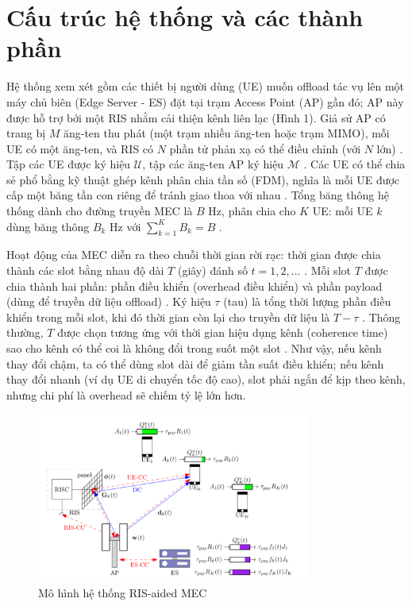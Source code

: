 \section{Cấu trúc hệ thống và các thành phần}


Hệ thống xem xét gồm các thiết bị người dùng (UE) muốn offload tác vụ lên một máy chủ biên (Edge Server - ES) đặt tại trạm Access Point (AP) gần đó; AP này được hỗ trợ bởi một RIS nhằm cải thiện kênh liên lạc (Hình 1). Giả sử AP có trang bị $M$ ăng-ten thu phát (một trạm nhiều ăng-ten hoặc trạm MIMO), mỗi UE có một ăng-ten, và RIS có $N$ phần tử phản xạ có thể điều chỉnh (với $N$ lớn) \cite{ris_latency}
. Tập các UE được ký hiệu $ \mathcal{U}$, tập các ăng-ten AP ký hiệu $ \mathcal{M}$
. Các UE có thể chia sẻ phổ bằng kỹ thuật ghép kênh phân chia tần số (FDM), nghĩa là mỗi UE được cấp một băng tần con riêng để tránh giao thoa với nhau
. Tổng băng thông hệ thống dành cho đường truyền MEC là $B$ Hz, phân chia cho $K$ UE: mỗi UE $k$ dùng băng thông $B_k$ Hz với $\sum_{k=1}^K B_k = B$ \cite{ris_latency}. 


Hoạt động của MEC diễn ra theo chuỗi thời gian rời rạc: thời gian được chia thành các slot bằng nhau độ dài $T$ (giây) đánh số $t = 1, 2, ...$
. Mỗi slot $T$ được chia thành hai phần: phần điều khiển (overhead điều khiển) và phần payload (dùng để truyền dữ liệu offload)
. Ký hiệu $\tau$ (tau) là tổng thời lượng phần điều khiển trong mỗi slot, khi đó thời gian còn lại cho truyền dữ liệu là $T - \tau$
\cite{ris_latency}
. Thông thường, $T$ được chọn tương ứng với thời gian hiệu dụng kênh (coherence time) sao cho kênh có thể coi là không đổi trong suốt một slot
. Như vậy, nếu kênh thay đổi chậm, ta có thể dùng slot dài để giảm tần suất điều khiển; nếu kênh thay đổi nhanh (ví dụ UE di chuyển tốc độ cao), slot phải ngắn để kịp theo kênh, nhưng chi phí là overhead sẽ chiếm tỷ lệ lớn hơn. 

\begin{figure}[H]
  \centering
  \includegraphics[width=0.8\textwidth]{images/f1.png}
  \caption{Mô hình hệ thống RIS-aided MEC}
    \label{fig:my-image}
\end{figure}



